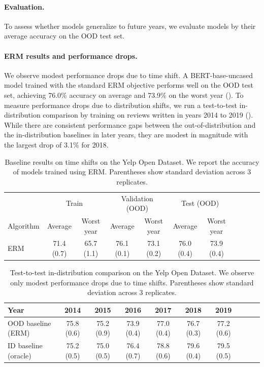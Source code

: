 \paragraph{Evaluation.}
To assess whether models generalize to future years, we evaluate models by their average accuracy on the OOD test set.

\paragraph{ERM results and performance drops.}
We observe modest performance drops due to time shift.
A BERT-base-uncased model trained with the standard ERM objective performs well on the OOD test set, achieving 76.0\% accuracy on average and 73.9\% on the worst year ().
To measure performance drops due to distribution shifts, we run a test-to-test in-distribution comparison by training on reviews written in years 2014 to 2019 ().
While there are consistent performance gaps between the out-of-distribution and the in-distribution baselines in later years, they are modest in magnitude with the largest drop of 3.1\% for 2018.

\begin{table}[tbp]
  \caption{Baseline results on time shifts on the Yelp Open Dataset. We report the accuracy of models trained using ERM. Parentheses show standard deviation across 3 replicates.}\label{tab:results_yelp_time}
  \centering
  \begin{small}
  \begin{tabular}{lcccccccccc}
  \toprule
   & \multicolumn{2}{c}{Train} & \multicolumn{2}{c}{Validation (OOD)} & \multicolumn{2}{c}{Test (OOD)}\\
  Algorithm & Average & Worst year & Average & Worst year & Average & Worst year \\
  \midrule
ERM	& 71.4 (0.7)	& 65.7 (1.1)	& 76.1 (0.1)	& 73.1 (0.2)	& 76.0 (0.4)	& 73.9 (0.4)\\
  \bottomrule
  \end{tabular}
  \end{small}
\end{table}

\begin{table}[tbp]
  \caption{Test-to-test in-distribution comparison on the Yelp Open Dataset. We observe only modest performance drops due to time shifts. Parentheses show standard deviation across 3 replicates.}\label{tab:compare_yelp_time}
  \centering
  \begin{tabular}{lccccccccc}
  \toprule
  Year & 2014 & 2015 & 2016 & 2017 & 2018 & 2019 \\
  \midrule
  OOD baseline (ERM) & 75.8 (0.6) & 75.2 (0.9) & 73.9 (0.4) & 77.0 (0.4) & 76.7 (0.3) & 77.2 (0.6) \\
  ID baseline (oracle) & 75.2 (0.5) & 75.0 (0.5) & 76.4 (0.7) & 78.8 (0.6) & 79.6 (0.4) & 79.5 (0.5) \\
  \bottomrule
  \end{tabular}
\end{table}


